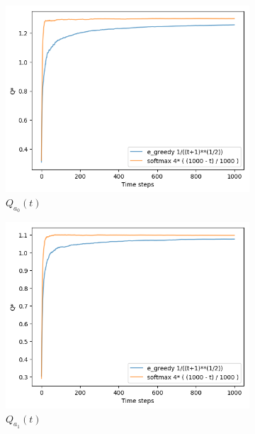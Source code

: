 \documentclass[letterpaper]{article}
\begin{document}
\begin{figure}[H]
  \begin{subfigure}{.5\textwidth}
    \centering
    \includegraphics[width=1\linewidth]{images/assign3/ex3/qta_0}
    \caption{$Q_{a_{0}}(t)$}
    \label{fig:qta_0_ex3}
  \end{subfigure}
  \begin{subfigure}{.5\textwidth}
    \centering
    \includegraphics[width=1\linewidth]{images/assign3/ex3/qta_1}
    \caption{$Q_{a_{1}}(t)$}
    \label{fig:qta_1_ex3}
  \end{subfigure}
  \begin{subfigure}{.5\textwidth}
    \centering

\end{subfigure}
\end{figure}
\end{document}

